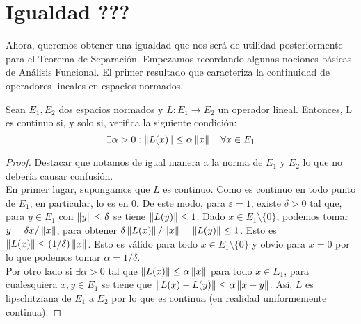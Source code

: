 \chapter{Igualdad ???}
\newcommand{\normSpace}{E}
	
Ahora, queremos obtener una igualdad que nos será de utilidad posteriormente para el Teorema de Separación. Empezamos recordando algunas nociones básicas de Análisis Funcional. El primer resultado que caracteriza la continuidad de operadores lineales en espacios normados.
	
\begin{proposicionBox}\label{caracCont}
Sean $ \normSpace_1, \normSpace_2 $ dos espacios normados y $ L:\normSpace_1 \longrightarrow \normSpace_2 $ un operador lineal. Entonces, L es continuo si, y solo si, verifica la siguiente condición:
\[
\exists \alpha > 0 : \norm{L(x)} \leq \alpha \norm{x} \quad \forall x \in \normSpace_1
\]
\end{proposicionBox}
\begin{proof}
Destacar que notamos de igual manera a la norma de $ \normSpace_1 \text{ y } \normSpace_2$ lo que no debería causar confusión.\\

En primer lugar, supongamos que $ L $ es continuo. Como es continuo en todo punto de $ \normSpace_1 $, en particular, lo es en 0. De este modo, para $ \varepsilon = 1 $, existe $ \delta >0  $  tal que, para $ y \in \normSpace_1 $ con $ \left\Vert y\right\Vert \leq \delta$ se tiene $ \left\Vert L(y)\right\Vert \leq 1 $. Dado $ x \in \normSpace_1 \setminus \{0\} $, podemos tomar $ y = \delta x / \left\Vert x\right\Vert $, para obtener $ \delta \left\Vert L(x)\right\Vert / \left\Vert x\right\Vert = \left\Vert L(y)\right\Vert \leq 1 $. Esto es $ \left\Vert L(x)\right\Vert \leq (1/\delta) \left\Vert x\right\Vert $. Esto es válido para todo $ x \in \normSpace_1 \setminus \{0\} $ y obvio para $ x = 0 $ por lo que podemos tomar $ \alpha = 1/\delta $. \\

Por otro lado si $ \exists \alpha > 0 $ tal que  $ \left\Vert L(x)\right\Vert \leq \alpha \left\Vert x\right\Vert $ para todo $ x \in \normSpace_1 $, para cualesquiera $ x,y \in \normSpace_1 $ se tiene que $ \left\Vert L(x) - L(y)\right\Vert \leq \alpha \left\Vert x-y\right\Vert $. Así, $ L $ es lipschitziana de $ \normSpace_1 \text{ a } \normSpace_2$ por lo que es continua (en realidad uniformemente continua).
\end{proof}

